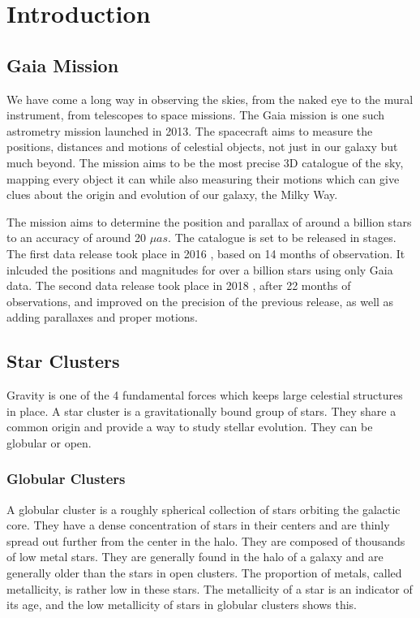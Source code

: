 \chapter{Introduction}\label{ch:ch1}

\section{Gaia Mission}
We have come a long way in observing the skies, from the naked eye to the mural instrument, from telescopes to space missions. The Gaia mission \citep{gaia} \citep{gaiafaccs} is one such astrometry mission launched in 2013. The spacecraft aims to measure the positions, distances and motions of celestial objects, not just in our galaxy but much beyond. The mission aims to be the most precise 3D catalogue of the sky, mapping every object it can while also measuring their motions which can give clues about the origin and evolution of our galaxy, the Milky Way.

The mission aims to determine the position and parallax of around a billion stars to an accuracy of around 20 $\mu as$. The catalogue is set to be released in stages. The first data release took place in 2016 \citep{gaiadr1}, based on 14 months of observation. It inlcuded the positions and magnitudes for over a billion stars using only Gaia data. The second data release took place in 2018 \citep{gaiadr2}, after 22 months of observations, and improved on the precision of the previous release, as well as adding parallaxes and proper motions.

\section{Star Clusters}
Gravity is one of the 4 fundamental forces which keeps large celestial structures in place. A star cluster is a gravitationally bound group of stars. They share a common origin and provide a way to study stellar evolution. They can be globular or open.

\subsection{Globular Clusters}
A globular cluster is a roughly spherical collection of stars orbiting the galactic core. They have a dense concentration of stars in their centers and are thinly spread out further from the center in the halo. They are composed of thousands of low metal stars. They are generally found in the halo of a galaxy and are generally older than the stars in open clusters. \citep{globclust} The proportion of metals, called metallicity, is rather low in these stars. The metallicity of a star is an indicator of its age, and the low metallicity of stars in globular clusters shows this. \citep{introstars}


